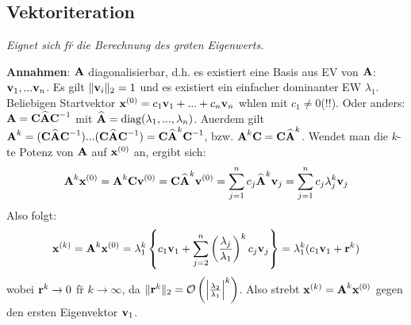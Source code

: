 \subsection{Vektoriteration}
\emph{Eignet sich f\u r die Berechnung des gr\o \s ten Eigenwerts.}

\textbf{Annahmen}:
$\mbox{\bf A}$ diagonalisierbar, d.h. es existiert eine Basis aus EV von $\mbox{\bf A}$: $\mbox{\bf v}_1, ... \mbox{\bf v}_n$. Es gilt $\Vert\mbox{\bf v}_i\Vert_2=1$ und es existiert ein einfacher dominanter EW $\lambda_1$. Beliebigen Startvektor $\mbox{\bf x}^{(0)}=c_1\mbox{\bf v}_1+...+c_n\mbox{\bf v}_n$ w\a hlen mit $c_1\neq 0$(!!). Oder anders: $\mbox{\bf A} = \mbox{\bf C}\widehat{\mbox{\bf A}}\mbox{\bf C}^{-1}$ mit $\widehat{\mbox{\bf A}}=\text{diag}(\lambda_1,...,\lambda_n)$. Au\s erdem gilt $\mbox{\bf A}^k = (\mbox{\bf C}\widehat{\mbox{\bf A}}\mbox{\bf C}^{-1})...(\mbox{\bf C}\widehat{\mbox{\bf A}}\mbox{\bf C}^{-1}) = \mbox{\bf C}\widehat{\mbox{\bf A}}^k\mbox{\bf C}^{-1}$, bzw. $\mbox{\bf A}^k\mbox{\bf C} = \mbox{\bf C}\widehat{\mbox{\bf A}}^k$. Wendet man die $k$-te Potenz von $\mbox{\bf A}$ auf $\mbox{\bf x}^{(0)}$ an, ergibt sich:
\begin{align*}
\mbox{\bf A}^k\mbox{\bf x}^{(0)} = \mbox{\bf A}^k\mbox{\bf C}\mbox{\bf v}^{(0)} = \mbox{\bf C}\widehat{\mbox{\bf A}}^k\mbox{\bf v}^{(0)} =  \sum_{j=1}^n c_j \widehat{\mbox{\bf A}}^k \mbox{\bf v}_j=\sum_{j=1}^n c_j \lambda_j^k \mbox{\bf v}_j
\end{align*}
Also folgt:
\begin{align*}
\mbox{\bf x}^{(k)} = \mbox{\bf A}^k\mbox{\bf x}^{(0)} = \lambda_1^k \left\{ c_1\mbox{\bf v}_1 + \sum_{j=2}^n \left( \frac{\lambda_j}{\lambda_1}\right)^k c_j \mbox{\bf v}_j \right\} = \lambda_1^k(c_1\mbox{\bf v}_1 + \mbox{\bf r}^k)
\end{align*}
wobei $\mbox{\bf r}^k \rightarrow 0$ f\u r $k\rightarrow \infty$, da $\Vert \mbox{\bf r}^k\Vert_2 = \mathcal{O}\left(\left|\frac{\lambda_2}{\lambda_1}\right|^k\right)$. Also strebt $\mbox{\bf x}^{(k)} = \mbox{\bf A}^k\mbox{\bf x}^{(0)}$ gegen den ersten Eigenvektor $\mbox{\bf v}_1$.


